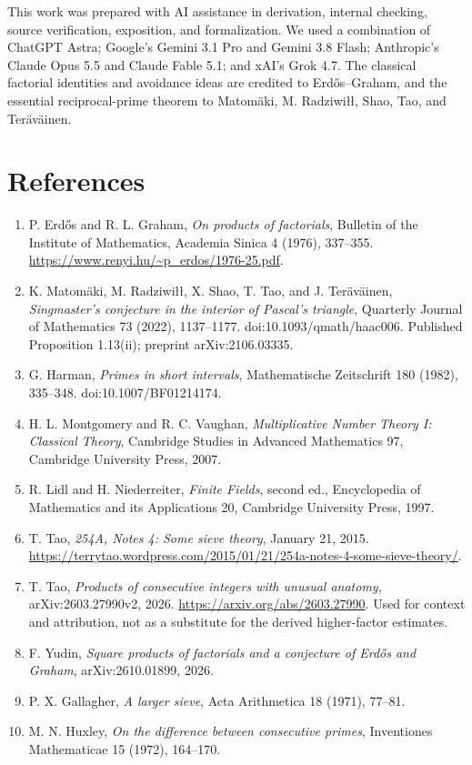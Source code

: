 \documentclass[letterpaper]{article}
\theoremstyle{definition}
\theoremstyle{remark}
\numberwithin{equation}{section}
\begin{document}
This work was prepared with AI assistance in derivation, internal checking, source verification,
exposition, and formalization. We used a combination of ChatGPT Astra; Google's Gemini 3.1 Pro
and Gemini 3.8 Flash; Anthropic's Claude Opus 5.5 and Claude Fable 5.1; and xAI's Grok 4.7. The
classical factorial identities and avoidance ideas are credited to Erd\H{o}s--Graham, and the essential
reciprocal-prime theorem to Matom\"aki, M. Radziwi\l\l, Shao, Tao, and Ter\"av\"ainen.

\section*{References}

\begin{enumerate}
\item P. Erd\H{o}s and R. L. Graham, \emph{On products of factorials}, Bulletin of the Institute of Mathematics,
  Academia Sinica 4 (1976), 337--355. \url{https://www.renyi.hu/~p_erdos/1976-25.pdf}.
\item K. Matom\"aki, M. Radziwi\l\l, X. Shao, T. Tao, and J. Ter\"av\"ainen, \emph{Singmaster's conjecture
  in the interior of Pascal's triangle}, Quarterly Journal of Mathematics 73 (2022), 1137--1177.
  doi:10.1093/qmath/haac006. Published Proposition 1.13(ii); preprint arXiv:2106.03335.
\item G. Harman, \emph{Primes in short intervals}, Mathematische Zeitschrift 180 (1982), 335--348.
  doi:10.1007/BF01214174.
\item H. L. Montgomery and R. C. Vaughan, \emph{Multiplicative Number Theory I: Classical Theory},
  Cambridge Studies in Advanced Mathematics 97, Cambridge University Press, 2007.
\item R. Lidl and H. Niederreiter, \emph{Finite Fields}, second ed., Encyclopedia of Mathematics and its
  Applications 20, Cambridge University Press, 1997.
\item T. Tao, \emph{254A, Notes 4: Some sieve theory}, January 21, 2015. \url{https://terrytao.wordpress.com/2015/01/21/254a-notes-4-some-sieve-theory/}.
\item T. Tao, \emph{Products of consecutive integers with unusual anatomy}, arXiv:2603.27990v2, 2026.
  \url{https://arxiv.org/abs/2603.27990}. Used for context and attribution, not as a substitute
  for the derived higher-factor estimates.
\item F. Yudin, \emph{Square products of factorials and a conjecture of Erd\H{o}s and Graham},
  arXiv:2610.01899, 2026.
\item P. X. Gallagher, \emph{A larger sieve}, Acta Arithmetica 18 (1971), 77--81.
\item M. N. Huxley, \emph{On the difference between consecutive primes}, Inventiones Mathematicae 15 (1972), 164--170.
\end{enumerate}
\end{document}
